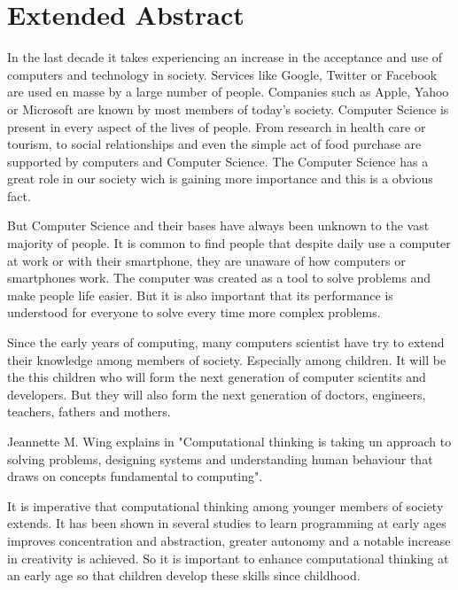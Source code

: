 \chapter*{Extended Abstract} %

In the last decade it takes experiencing an increase in the acceptance and use of computers and technology in society. Services like Google, Twitter or Facebook are used en masse by a large number of people. Companies such as Apple, Yahoo or Microsoft are known by most members of today's society. Computer Science is present in every aspect of the lives of people. From research in health care or tourism, to social relationships and even the simple act of food purchase are supported by computers and Computer Science. The Computer Science has a great role in our society wich is gaining more importance and this is a obvious fact.

But Computer Science and their bases have always been unknown to the vast majority of people. It is common to find people that despite daily use a computer at work or with their smartphone, they are unaware of how computers or smartphones work. The computer was created as a tool to solve problems and make people life easier. But it is also important that its performance is understood for everyone to solve every time more complex problems.

Since the early years of computing, many computers scientist have try to extend their knowledge among members of society. Especially among children. It will be the this children who will form the next generation of computer scientits and developers. But they will also form the next generation of doctors, engineers, teachers, fathers and mothers.

Jeannette M. Wing explains in \cite{Wing3717} "Computational thinking is taking un approach to solving problems, designing systems and understanding human behaviour that draws on concepts fundamental to computing". 

It is imperative that computational thinking among younger members of society extends. It has been shown in several studies to learn programming at early ages improves concentration and abstraction, greater autonomy and a notable increase in creativity is achieved. So it is important to enhance computational thinking at an early age so that children develop these skills since childhood.

